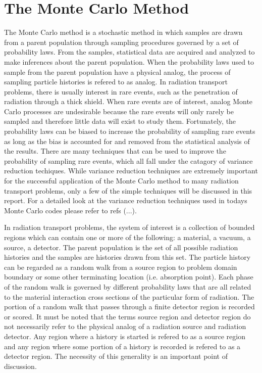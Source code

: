 \section{The Monte Carlo Method}
\label{sec:monte_carlo_method}
The Monte Carlo method is a stochastic method in which samples are drawn from 
a parent population through sampling procedures governed by a set of 
probability laws. From the samples, statistical data are acquired and analyzed 
to make inferences about the parent population. When the probability laws used 
to sample from the parent population have a 
physical analog, the process of sampling particle histories is refered to as 
analog. In radiation transport problems, there is usually interest in rare
events, such as the penetration of radiation through a thick shield. When rare
events are of interest, analog Monte Carlo processes are undesirable
because the rare events will only rarely be sampled and therefore little data
will exist to study them. Fortunately, the probability laws can be biased to 
increase the probability of sampling rare events as long as the bias is 
accounted for and removed from the statistical analysis of the results. There
are many techniques that can be used to improve the probability of sampling
rare events, which all fall under the catagory of variance reduction techiques.
While variance reduction techniques are extremely important for the successful
application of the Monte Carlo method to many radiation transport problems, 
only a few of the simple techniques will be discussed in this report. For a
detailed look at the variance reduction techniques used in todays Monte Carlo
codes please refer to refs (...). 

In radiation transport problems, the system of interest is a collection of 
bounded regions which can contain one or more of the following: a material, a 
vacuum, a source, a detector. The parent population is the 
set of all possible radiation histories and the samples are histories drawn 
from this set. The particle history can be regarded as a random walk from a 
source region to problem domain boundary or some other terminating location
(i.e. absorption point). Each phase of the random walk is governed by different 
probability laws that are all related to the material interaction cross sections
of the particular form of radiation. The portion of a random walk that passes 
through a finite detector region is recorded or scored. It must be noted that
the terms source region and detector region do not necessarily refer to the 
physical analog of a radiation source and radiation detector. Any region where
a history is started is refered to as a source region and any region where
some portion of a history is recorded is refered to as a detector region. The
necessity of this generality is an important point of discussion. 

